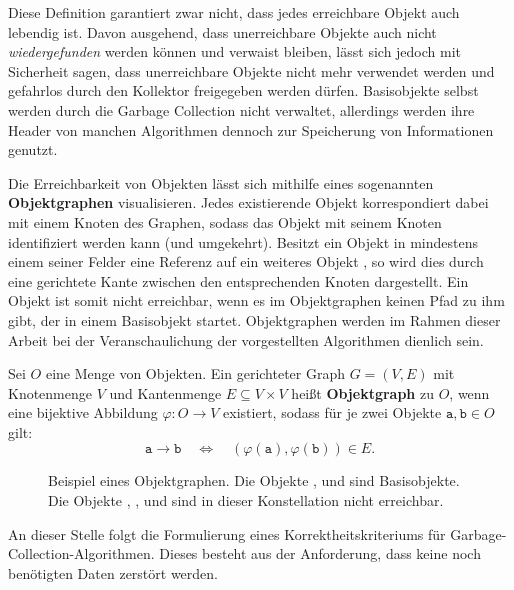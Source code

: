 Diese Definition garantiert zwar nicht, dass jedes erreichbare Objekt auch lebendig ist.
Davon ausgehend, dass unerreichbare Objekte auch nicht \textit{wiedergefunden} werden können und verwaist bleiben, lässt sich jedoch mit Sicherheit sagen, dass unerreichbare Objekte nicht mehr verwendet werden und gefahrlos durch den Kollektor freigegeben werden dürfen.
Basisobjekte selbst werden durch die Garbage Collection nicht verwaltet, allerdings werden ihre Header von manchen Algorithmen dennoch zur Speicherung von Informationen genutzt.

Die Erreichbarkeit von Objekten lässt sich mithilfe eines sogenannten \textbf{Objektgraphen} visualisieren.
Jedes existierende Objekt korrespondiert dabei mit einem Knoten des Graphen, sodass das Objekt mit seinem Knoten identifiziert werden kann (und umgekehrt).
Besitzt ein Objekt  in mindestens einem seiner Felder eine Referenz auf ein weiteres Objekt , so wird dies durch eine gerichtete Kante zwischen den entsprechenden Knoten dargestellt.
Ein Objekt ist somit nicht erreichbar, wenn es im Objektgraphen keinen Pfad zu ihm gibt, der in einem Basisobjekt startet.
Objektgraphen werden im Rahmen dieser Arbeit bei der Veranschaulichung der vorgestellten Algorithmen dienlich sein.

	
\begin{mybox}
\begin{defn}[Objektgraph]
	Sei $O$ eine Menge von Objekten.
	Ein gerichteter Graph $G = (V,E)$ mit Knotenmenge $V$ und Kantenmenge $E \subseteq V \times V$ heißt \textbf{Objektgraph} zu $O$, wenn eine bijektive Abbildung $\varphi \colon O \rightarrow V$ existiert, sodass für je zwei Objekte $\mathtt{a,b} \in O$ gilt:
	\[
		\mathtt{a} \rightarrow \mathtt{b} \quad \Leftrightarrow \quad (\varphi(\mathtt{a}),\varphi(\mathtt{b})) \in E.
	\]
\end{defn}
\end{mybox}

\begin{figure}[h]
	\centering
	
	\caption[Beispiel eines Objektgraphen]{Beispiel eines Objektgraphen. Die Objekte ,  und  sind Basisobjekte. Die Objekte , ,  und  sind in dieser Konstellation nicht erreichbar.}
\end{figure}

An dieser Stelle folgt die Formulierung eines Korrektheitskriteriums für Garbage-Collection-Algorithmen.
Dieses besteht aus der Anforderung, dass keine noch benötigten Daten zerstört werden.

